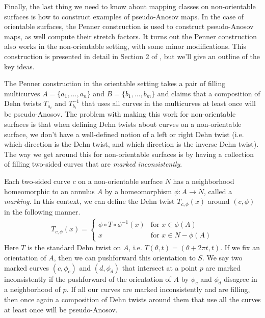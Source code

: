 
Finally, the last thing we need to know about mapping classes on non-orientable surfaces is how to
construct examples of pseudo-Anosov maps. In the case of orientable surfaces, the Penner
construction is used to construct pseudo-Anosov maps, as well compute their stretch factors. It
turns out the Penner construction also works in the non-orientable setting, with some minor
modifications. This construction is presented in detail in Section 2 of \cite{Strenner_2017}, but
we'll give an outline of the key ideas.

The Penner construction in the orientable setting takes a pair of filling multicurves $A = \{a_1,\dots,a_n\}$
and $B = \{b_1,\dots,b_m\}$ and claims that a composition of Dehn twists $T_{a_i}$ and $T_{b_i}^{-1}$ that
uses all curves in the multicurves at least once will be pseudo-Anosov. The problem with making this work for
non-orientable surfaces is that when defining Dehn twists about curves on a non-orientable surface, we don't
have a well-defined notion of a left or right Dehn twist (i.e. which direction is the Dehn twist, and which
direction is the inverse Dehn twist). The way we get around this for non-orientable surfaces is by having a
collection of filling two-sided curves that are \textit{marked inconsistently}.

Each two-sided curve $c$ on a non-orientable surface $N$ has a neighborhood homeomorphic to an
annulus $A$ by a homeomorphism $\phi: A \xrightarrow{} N$, called a \textit{marking}. In this
context, we can define the Dehn twist $T_{c,\phi}(x)$ around $(c,\phi)$ in the following manner.
\begin{align*}
  T_{c,\phi}(x) =
  \begin{cases}
    \phi \circ T \circ \phi^{-1}(x) & \text{for } x \in \phi(A) \\
    x & \text{for } x \in N - \phi(A)
  \end{cases}
\end{align*}
Here $T$ is the standard Dehn twist on $A$, i.e. $T(\theta,t) = (\theta + 2\pi t,t)$. If we fix an
orientation of $A$, then we can pushforward this orientation to $S$. We say two marked curves
$(c,\phi_c)$ and $(d,\phi_d)$ that intersect at a point $p$ are marked inconsistently if the
pushforward of the orientation of $A$ by $\phi_c$ and $\phi_d$ disagree in a neighborhood of $p$.
If all our curves are marked inconsistently and are filling, then once again a composition of Dehn
twists around them that use all the curves at least once will be pseudo-Anosov.

